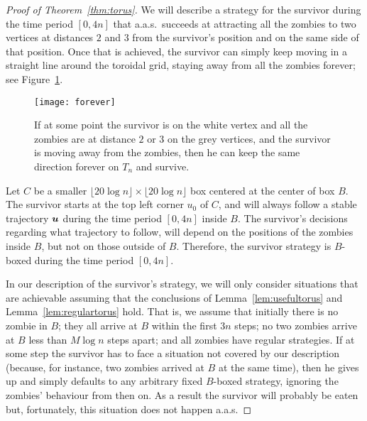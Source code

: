\documentclass[12pt]{amsart}
\begin{document}
\begin{proof}[Proof of Theorem~\ref{thm:torus}]
We will describe a strategy for the survivor during the time period $[0,4n]$ that a.a.s.\ succeeds at attracting all the zombies to two vertices at distances $2$ and $3$ from the survivor's position
and on the same side of that position. Once that is achieved, the survivor can simply keep moving in a straight line around the toroidal grid, staying away from all the zombies forever; see Figure~\ref{fig:forever}.
\begin{figure}
\texttt{[image: forever]}
\caption{If at some point the survivor is on the white vertex and all the zombies are at distance $2$ or $3$ on the grey vertices, and the survivor is moving away from the zombies,
then he can keep the same direction forever on $T_n$ and survive.}
\label{fig:forever}
\end{figure}


Let $C$ be a smaller $ \lfloor 20\log n \rfloor  \times \lfloor 20\log n \rfloor $ box centered at the center of box $B$. The survivor starts at the top left corner $u_0$ of $C$, and will always follow a stable trajectory ${\boldsymbol u}$
during the time period $[0,4n]$ inside $B$. The survivor's decisions regarding what trajectory to follow, will depend on the positions of the zombies inside $B$, but not on those outside of $B$. Therefore, the
survivor strategy is $B$-boxed during the time period $[0,4n]$.

In our description of the survivor's strategy, we will only consider situations that are achievable assuming that the conclusions of Lemma~\ref{lem:usefultorus} and Lemma~\ref{lem:regulartorus} hold. That is, we assume that initially there is no zombie in $B$; they all arrive at $B$ within the first $3n$ steps; no two zombies arrive at $B$ less than $M\log n$ steps apart; and all zombies have
regular strategies. If at some step the survivor has to face a situation not covered by our description (because, for instance, two zombies arrived at $B$ at the same time), then he gives up and simply defaults to
any arbitrary fixed $B$-boxed strategy, ignoring the zombies' behaviour from then on. As a result the survivor will probably be eaten but, fortunately, this situation does not happen a.a.s.



\end{proof}
\end{document}
